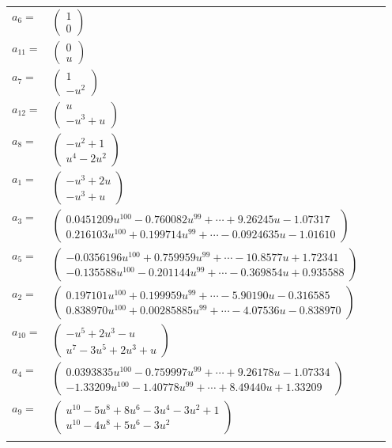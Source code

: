 \documentclass[1p]{elsarticle_modified}
\theoremstyle{definition}
\begin{document}
\begin{tabular}{m{7pt} m{180pt} m{7pt} m{180pt} }
\flushright $a_{6}=$&$\begin{pmatrix}1\\0\end{pmatrix}$ \\
\flushright $a_{11}=$&$\begin{pmatrix}0\\u\end{pmatrix}$ \\
\flushright $a_{7}=$&$\begin{pmatrix}1\\- u^2\end{pmatrix}$ \\
\flushright $a_{12}=$&$\begin{pmatrix}u\\- u^3+u\end{pmatrix}$ \\
\flushright $a_{8}=$&$\begin{pmatrix}- u^2+1\\u^4-2 u^2\end{pmatrix}$ \\
\flushright $a_{1}=$&$\begin{pmatrix}- u^3+2 u\\- u^3+u\end{pmatrix}$ \\
\flushright $a_{3}=$&$\begin{pmatrix}0.0451209 u^{100}-0.760082 u^{99}+\cdots+9.26245 u-1.07317\\0.216103 u^{100}+0.199714 u^{99}+\cdots-0.0924635 u-1.01610\end{pmatrix}$ \\
\flushright $a_{5}=$&$\begin{pmatrix}-0.0356196 u^{100}+0.759959 u^{99}+\cdots-10.8577 u+1.72341\\-0.135588 u^{100}-0.201144 u^{99}+\cdots-0.369854 u+0.935588\end{pmatrix}$ \\
\flushright $a_{2}=$&$\begin{pmatrix}0.197101 u^{100}+0.199959 u^{99}+\cdots-5.90190 u-0.316585\\0.838970 u^{100}+0.00285885 u^{99}+\cdots-4.07536 u-0.838970\end{pmatrix}$ \\
\flushright $a_{10}=$&$\begin{pmatrix}- u^5+2 u^3- u\\u^7-3 u^5+2 u^3+u\end{pmatrix}$ \\
\flushright $a_{4}=$&$\begin{pmatrix}0.0393835 u^{100}-0.759997 u^{99}+\cdots+9.26178 u-1.07334\\-1.33209 u^{100}-1.40778 u^{99}+\cdots+8.49440 u+1.33209\end{pmatrix}$ \\
\flushright $a_{9}=$&$\begin{pmatrix}u^{10}-5 u^8+8 u^6-3 u^4-3 u^2+1\\u^{10}-4 u^8+5 u^6-3 u^2\end{pmatrix}$\\&\end{tabular}
\end{document}
